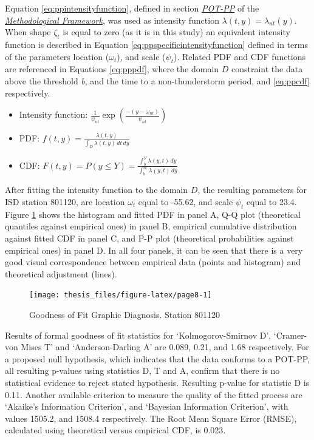 \documentclass[12pt,oneside]{reedthesis}
\begin{document}
Equation \eqref{eq:ppintensityfunction}, defined in section \emph{\protect\hyperlink{method-pot-pp}{POT-PP}} of the \emph{\protect\hyperlink{rmd-thefra}{Methodological Framework}}, was used as intensity function \(\lambda(t, y) = \lambda_{nt}(y)\). When shape \(\zeta_t\) is equal to zero (as it is in this study) an equivalent intensity function is described in Equation \eqref{eq:ppspecificintensityfunction} defined in terms of the parameters location (\(\omega_t\)), and scale (\(\psi_t\)). Related PDF and CDF functions are referenced in Equations \eqref{eq:pppdf}, where the domain \(D\) constraint the data above the threshold \emph{b}, and the time to a non-thunderstorm period, and \eqref{eq:ppcdf} respectively.
\begin{itemize}
\item
  Intensity function: \(\frac{1}{\psi_{nt}}\exp\left(\frac{-(y-\omega_{nt})}{\psi_{nt}}\right)\)
\item
  PDF: \(f(t,y) = \frac{\lambda(t,y)}{\int_D\lambda(t,y)\,dt\,dy}\)
\item
  CDF: \(F(t,y) = P(y \leq Y) = \frac{\int_b^Y\lambda(y,t)\,dy}{\int_b^\infty\lambda(y,t)\,dy}\)
\end{itemize}
After fitting the intensity function to the domain \(D\), the resulting parameters for ISD station 801120, are location \(\omega_t\) equal to -55.62, and scale \(\psi_t\) equal to 23.4. Figure \ref{fig:page8} shows the histogram and fitted PDF in panel A, Q-Q plot (theoretical quantiles against empirical ones) in panel B, empirical cumulative distribution against fitted CDF in panel C, and P-P plot (theoretical probabilities against empirical ones) in panel D. In all four panels, it can be seen that there is a very good visual correspondence between empirical data (points and histogram) and theoretical adjustment (lines).
\begin{figure}

{\centering \texttt{[image: thesis\_files/figure-latex/page8-1]} 

}

\caption{Goodness of Fit Graphic Diagnosis. Station 801120}\label{fig:page8}
\end{figure}
Results of formal goodness of fit statistics for `Kolmogorov-Smirnov D', `Cramer-von Mises T' and `Anderson-Darling A' are 0.089, 0.21, and 1.68 respectively. For a proposed null hypothesis, which indicates that the data conforms to a POT-PP, all resulting p-values using statistics D, T and A, confirm that there is no statistical evidence to reject stated hypothesis. Resulting p-value for statistic D is 0.11. Another available criterion to measure the quality of the fitted process are `Akaike's Information Criterion', and `Bayesian Information Criterion', with values 1505.2, and 1508.4 respectively. The Root Mean Square Error (RMSE), calculated using theoretical versus empirical CDF, is 0.023.
\end{document}
